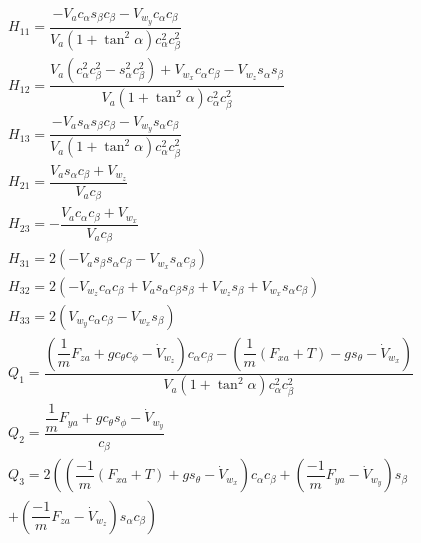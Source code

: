 \documentclass{ifacconf}
\begin{document}
\begin{gather*}
H_{11}=\dfrac{-V_a c_\alpha s_\beta  c_\beta - V_{w_y} c_\alpha c_\beta}{V_a(1+\tan^2\alpha)c^2_\alpha c^2_\beta}\\
H_{12}=\dfrac{V_a(c^2_\alpha c^2_\beta-s^2_\alpha c^2_\beta) + V_{w_x}c_\alpha c_\beta - V_{w_z}s_\alpha s_\beta}{V_a(1+\tan^2\alpha)c^2_\alpha c^2_\beta}\\
H_{13}=\dfrac{-V_a s_\alpha s_\beta  c_\beta - V_{w_y} s_\alpha c_\beta}{V_a(1+\tan^2\alpha)c^2_\alpha c^2_\beta}\\
H_{21}=\dfrac{V_a s_\alpha c_\beta + V_{w_z}}{V_a c_\beta}\\
H_{23}=-\dfrac{V_a c_\alpha c_\beta + V_{w_x}}{V_a c_\beta}\\
H_{31}=2 \left(-V_a s_\beta s_\alpha c_\beta - V_{w_x} s_\alpha c_\beta \right)\\
H_{32}=2\left( -V_{w_z} c_\alpha c_\beta + V_as_\alpha c_\beta s_\beta
 + V_{w_z}s_\beta + V_{w_x}s_\alpha c_\beta \right)\\
H_{33}=2\left(V_{w_y}c_\alpha c_\beta - V_{w_x}s_\beta\right)\\
Q_1=\dfrac{\left(\dfrac{1}{m}F_{za} + gc_\theta c_\phi - \dot{V}_{w_z} \right)c_\alpha c_\beta - \left(\dfrac{1}{m}(F_{xa} + T)-gs_\theta - \dot{V}_{w_x}\right)}{V_a(1+\tan^2\alpha)c^2_\alpha c^2_\beta}\\
Q_2=\dfrac{\dfrac{1}{m}F_{ya}+g c_\theta s_\phi-\dot{V}_{w_y}}{c_\beta}\\
Q_3=2 \left( \left(\dfrac{-1}{m}(F_{xa}+T) + g s_\theta - \dot{V}_{w_x} \right)c_\alpha c_\beta + \left( \dfrac{-1}{m}F_{ya} - \dot{V}_{w_y} \right)s_\beta \right.\\
\left. + \left(\dfrac{-1}{m}F_{za} - \dot{V}_{w_z} \right)s_\alpha c_\beta \right)
\label{eq:Ra_dot}
\end{gather*}
\end{document}
